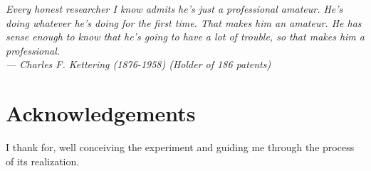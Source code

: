 
\begin{flushright}{\slshape    
Every honest researcher I know admits he's just a professional amateur.
He's doing whatever he's doing for the first time. That makes him an amateur.
He has sense enough to know that he's going to have a lot of trouble,
so that makes him a professional.\\ \medskip
--- Charles F. Kettering (1876-1958) (Holder of 186 patents)}
\end{flushright}



\bigskip

\begingroup
\let\clearpage\relax
\let\cleardoublepage\relax
\let\cleardoublepage\relax
\chapter*{Acknowledgements}
I thank \myProf for, well conceiving the experiment and guiding me through the process of its realization.
\bigskip


\endgroup



